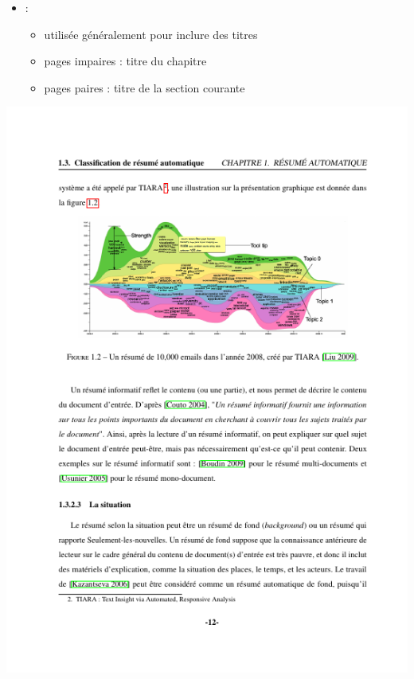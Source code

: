 \documentclass[xcolor=table]{beamer}
\begin{document}
\begin{frame}
\begin{minipage}{0.52\textwidth}
\begin{itemize}
		\item {}: 
		\begin{itemize}
			\item utilisée généralement pour inclure des titres
			\item pages impaires : titre du chapitre
			\item pages paires : titre de la section courante
		\end{itemize}
	\end{itemize}
\end{minipage}
\begin{minipage}{0.42\textwidth}
	\includegraphics[width=\textwidth]{..//img/Bweb03-redaction/dev.png}
\end{minipage}

\end{frame}
\end{document}
